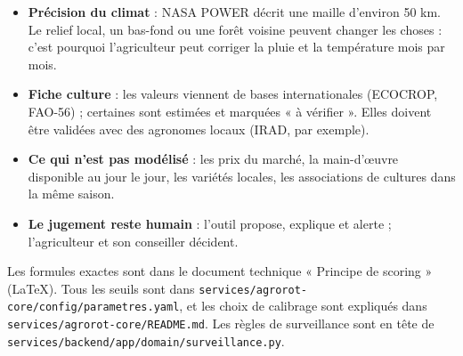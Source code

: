 \documentclass[11pt,a4paper]{article}
\begin{document}
\begin{itemize}
\item \textbf{Précision du climat} : NASA POWER décrit une maille d'environ 50 km. Le relief local, un bas-fond ou
une forêt voisine peuvent changer les choses : c'est pourquoi l'agriculteur peut corriger la pluie et la température mois par mois.
\item \textbf{Fiche culture} : les valeurs viennent de bases internationales (ECOCROP, FAO-56) ; certaines sont
estimées et marquées « à vérifier ». Elles doivent être validées avec des agronomes locaux (IRAD, par exemple).
\item \textbf{Ce qui n'est pas modélisé} : les prix du marché, la main-d'œuvre disponible au jour le jour, les
variétés locales, les associations de cultures dans la même saison.
\item \textbf{Le jugement reste humain} : l'outil propose, explique et alerte ; l'agriculteur et son conseiller décident.
\end{itemize}

\begin{idee}
Les formules exactes sont dans le document technique « Principe de scoring » (LaTeX). Tous les seuils sont dans
\texttt{services/agrorot-core/config/parametres.yaml}, et les choix de calibrage sont expliqués dans
\texttt{services/agrorot-core/README.md}. Les règles de surveillance sont en tête de
\texttt{services/backend/app/domain/surveillance.py}.
\end{idee}
\end{document}
